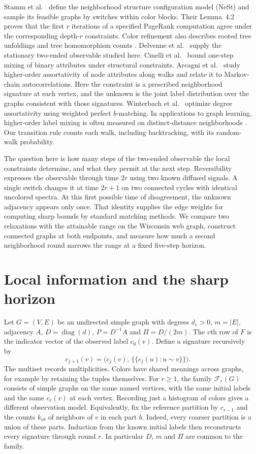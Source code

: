 \documentclass[11pt]{article}
\newcommand{\F}{\mathcal F}
\begin{document}
Stamm et al.\ \cite{nest} define the neighborhood structure configuration model (NeSt) and sample its feasible graphs by switches within color blocks. Their Lemma~4.2 proves that the first $r$ iterations of a specified PageRank computation agree under the corresponding depth-$r$ constraints. Color refinement also describes rooted tree unfoldings and tree homomorphism counts \cite{dell}. Delvenne et al.\ \cite{stability} supply the stationary two-ended observable studied here. Cinelli et al.\ \cite{cinelli} bound one-step mixing of binary attributes under structural constraints. Arcagni et al.\ \cite{arcagni} study higher-order assortativity of node attributes along walks and relate it to Markov-chain autocorrelations. Here the constraint is a prescribed neighborhood signature at each vertex, and the unknown is the joint label distribution over the graphs consistent with those signatures. Winterbach et al.\ \cite{winterbach} optimize degree assortativity using weighted perfect $b$-matching. In applications to graph learning, higher-order label mixing is often measured on distinct-distance neighborhoods \cite{zhu}. Our transition rule counts each walk, including backtracking, with its random-walk probability.

The question here is how many steps of the two-ended observable the local constraints determine, and what they permit at the next step. Reversibility expresses the observable through time $2r$ using two known diffused signals. A single switch changes it at time $2r+1$ on two connected cycles with identical uncolored spectra. At this first possible time of disagreement, the unknown adjacency appears only once. That identity supplies the edge weights for computing sharp bounds by standard matching methods. We compare two relaxations with the attainable range on the Wisconsin web graph, construct connected graphs at both endpoints, and measure how much a second neighborhood round narrows the range at a fixed five-step horizon.

\section{Local information and the sharp horizon}
Let $G=(V,E)$ be an undirected simple graph with degrees $d_v>0$, $m=|E|$, adjacency $A$, $D=\operatorname{diag}(d)$, $P=D^{-1}A$ and $\Pi=D/(2m)$. The $v$th row of $F$ is the indicator vector of the observed label $c_0(v)$. Define a signature recursively by
\[
 c_{j+1}(v)=\big(c_j(v),\,\{\!\{c_j(u):u\sim v\}\!\}\big).
\]
The multiset records multiplicities. Colors have shared meanings across graphs, for example by retaining the tuples themselves. For $r\ge1$, the family $\F_r(G)$ consists of simple graphs on the same named vertices, with the same initial labels and the same $c_r(v)$ at each vertex. Recording just a histogram of colors gives a different observation model. Equivalently, fix the reference partition by $c_{r-1}$ and the counts $k_{vb}$ of neighbors of $v$ in each part $b$. Indeed, every coarser partition is a union of these parts. Induction from the known initial labels then reconstructs every signature through round $r$. In particular $D$, $m$ and $\Pi$ are common to the family.
\end{document}
